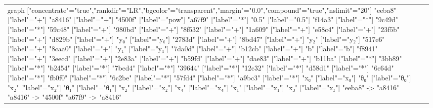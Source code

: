 \documentclass{beamer}
\begin{document}
\begin{frame}[fragile]
\begin{table}[H]
\begin{tabular}{lll}
\begin{adjustbox}{minipage={.4\textwidth}, height=0.22\textwidth, margin*=0cm 0cm 0cm 0.1cm}
{                          graph ["concentrate"="true","rankdir"="LR","bgcolor"="transparent","margin"="0.0","compound"="true","nslimit"="20"]
                          "eeba8" ["label"="+"]
                          "a8416" ["label"="+"]
                          "4500f" ["label"="pow"]
                          "a67f9" ["label"="*"]
                          "0.5" ["label"="0.5"]
                          "f14a3" ["label"="*"]
                          "9c49d" ["label"="*"]
                          "59c48" ["label"="+"]
                          "980bd" ["label"="+"]
                          "8f532" ["label"="+"]
                          "1a609" ["label"="+"]
                          "e58c4" ["label"="+"]
                          "23f5b" ["label"="+"]
                          "d829b" ["label"="+"]
                          "y₀" ["label"="y₀"]
                          "2783d" ["label"="+"]
                          "8bd47" ["label"="+"]
                          "y₂" ["label"="y₂"]
                          "517e6" ["label"="+"]
                          "8caa0" ["label"="+"]
                          "y₁" ["label"="y₁"]
                          "7da0d" ["label"="+"]
                          "b12cb" ["label"="+"]
                          "b" ["label"="b"]
                          "f8941" ["label"="+"]
                          "3eecd" ["label"="+"]
                          "2e83a" ["label"="+"]
                          "b59fd" ["label"="+"]
                          "dae83" ["label"="+"]
                          "b11ba" ["label"="*"]
                          "3bb89" ["label"="*"]
                          "b2454" ["label"="*"]
                          "7bed4" ["label"="*"]
                          "39644" ["label"="*"]
                          "12c32" ["label"="*"]
                          "d58d1" ["label"="*"]
                          "6c64d" ["label"="*"]
                          "fb0f0" ["label"="*"]
                          "6c2be" ["label"="*"]
                          "57fd4" ["label"="*"]
                          "a9bc3" ["label"="*"]
                          "x₀" ["label"="x₀"]
                          "θ₀" ["label"="θ₀"]
                          "x₂" ["label"="x₂"]
                          "θ₁" ["label"="θ₁"]
                          "x₂" ["label"="x₂"]
                          "x₄" ["label"="x₄"]
                          "x₁" ["label"="x₁"]
                          "x₃" ["label"="x₃"]
                          "eeba8" -> "a8416"
                          "a8416" -> "4500f"
                          "a67f9" -> "a8416"
}
\end{adjustbox}
\end{tabular}
\end{table}
\end{frame}
\end{document}
